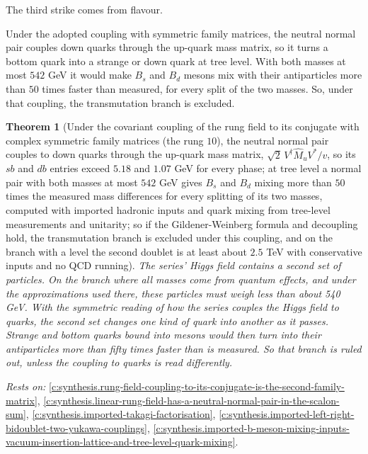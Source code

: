 \documentclass[11pt]{article}
\newtheorem{theorem}{Theorem}[section]
\theoremstyle{definition}
\theoremstyle{plain}
\begin{document}
The third strike comes from flavour.

Under the adopted coupling with symmetric family matrices, the neutral normal pair couples down quarks through the up-quark mass matrix, so it turns a bottom quark into a strange or down quark at tree level. With both masses at most $542$ GeV it would make $B_{s}$ and $B_{d}$ mesons mix with their antiparticles more than $50$ times faster than measured, for every split of the two masses. So, under that coupling, the transmutation branch is excluded.

\begin{theorem}[Under the covariant coupling of the rung field to its conjugate with complex symmetric family matrices (the rung $10$), the neutral normal pair couples to down quarks through the up-quark mass matrix, $\sqrt2\,V^{\dagger}\hat{M}_{u}V^{*}/v$, so its $sb$ and $db$ entries exceed $5.18$ and $1.07$ GeV for every phase; at tree level a normal pair with both masses at most $542$ GeV gives $B_{s}$ and $B_{d}$ mixing more than $50$ times the measured mass differences for every splitting of its two masses, computed with imported hadronic inputs and quark mixing from tree-level measurements and unitarity; so if the Gildener-Weinberg formula and decoupling hold, the transmutation branch is excluded under this coupling, and on the branch with a level the second doublet is at least about $2.5$ TeV with conservative inputs and no QCD running]\label{c:synthesis.covariant-rung-coupling-gives-the-normal-pair-tree-level-b-meson-mixing-that-excludes-the-transmutation-branch}
The series' Higgs field contains a second set of particles. On the branch where all masses come from quantum effects, and under the approximations used there, these particles must weigh less than about 540 GeV. With the symmetric reading of how the series couples the Higgs field to quarks, the second set changes one kind of quark into another as it passes. Strange and bottom quarks bound into mesons would then turn into their antiparticles more than fifty times faster than is measured. So that branch is ruled out, unless the coupling to quarks is read differently.
\end{theorem}
\noindent\emph{Rests on:} \ref{c:synthesis.rung-field-coupling-to-its-conjugate-is-the-second-family-matrix}, \ref{c:synthesis.linear-rung-field-has-a-neutral-normal-pair-in-the-scalon-sum}, \ref{c:synthesis.imported-takagi-factorisation}, \ref{c:synthesis.imported-left-right-bidoublet-two-yukawa-couplings}, \ref{c:synthesis.imported-b-meson-mixing-inputs-vacuum-insertion-lattice-and-tree-level-quark-mixing}.
\end{document}
